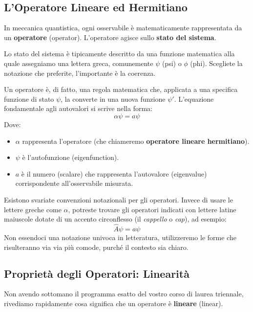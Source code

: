 \subsection{L'Operatore Lineare ed Hermitiano}

In meccanica quantistica, ogni osservabile è matematicamente rappresentata da un \textbf{operatore} (operator). L'operatore agisce sullo \textbf{stato del sistema}.

Lo stato del sistema è tipicamente descritto da una funzione matematica alla quale assegniamo una lettera greca, comunemente $\psi$ (psi) o $\phi$ (phi). Scegliete la notazione che preferite, l'importante è la coerenza.

Un operatore è, di fatto, una regola matematica che, applicata a una specifica funzione di stato $\psi$, la converte in una nuova funzione $\psi'$.
L'equazione fondamentale agli autovalori si scrive nella forma:
\begin{equation}
\alpha \psi = a \psi
\end{equation}
Dove:
\begin{itemize}
\item $\alpha$ rappresenta l'operatore (che chiameremo \textbf{operatore lineare hermitiano}).
\item $\psi$ è l'autofunzione (eigenfunction).
\item $a$ è il numero (scalare) che rappresenta l'autovalore (eigenvalue) corrispondente all'osservabile misurata.
\end{itemize}

Esistono svariate convenzioni notazionali per gli operatori. Invece di usare le lettere greche come $\alpha$, potreste trovare gli operatori indicati con lettere latine maiuscole dotate di un accento circonflesso (il \textit{cappello} o \textit{cap}), ad esempio:
\begin{equation}
\hat{A} \psi = a \psi
\end{equation}
Non essendoci una notazione univoca in letteratura, utilizzeremo le forme che risulteranno via via più comode, purché il contesto sia chiaro.

\subsection{Proprietà degli Operatori: Linearità}

Non avendo sottomano il programma esatto del vostro corso di laurea triennale, rivediamo rapidamente cosa significa che un operatore è \textbf{lineare} (linear).

